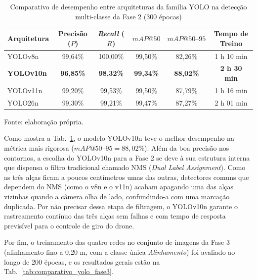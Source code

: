 \begin{table}[H]
	\centering
	\small
	\setlength{\tabcolsep}{5pt}
	\captionsetup{justification=centering}
	\caption{Comparativo de desempenho entre arquiteturas da família YOLO na detecção multi-classe da Fase 2 (300 épocas)}
	\label{tab:comparativo_yolo_fase2}
	\vspace{0.2cm}
	\begin{tabular}{lccccc}
		\hline
		\textbf{Arquitetura} & \textbf{Precisão ($P$)} & \textbf{\textit{Recall} ($R$)} & \textbf{$mAP@50$} & \textbf{$mAP@50\text{--}95$} & \textbf{Tempo de Treino} \\
		\hline
		YOLOv8n  & 99,64\% & 100,00\% & 99,50\% & 82,26\% & 1 h 10 min \\
		\textbf{YOLOv10n} & \textbf{96,85\%} & \textbf{98,32\%} & \textbf{99,34\%} & \textbf{88,02\%} & \textbf{2 h 30 min} \\
		YOLOv11n & 99,20\% & 99,53\%  & 99,50\% & 87,79\% & 1 h 16 min \\
		YOLO26n  & 99,30\% & 99,21\%  & 99,47\% & 87,27\% & 2 h 01 min \\
		\hline
	\end{tabular}
	\vspace{0.2cm}
	\begin{flushleft}
		\footnotesize Fonte: elaboração própria.
	\end{flushleft}
\end{table}

Como mostra a Tab.~\ref{tab:comparativo_yolo_fase2}, o modelo YOLOv10n teve o melhor desempenho na métrica mais rigorosa ($mAP@50\text{--}95 = 88{,}02\%$). Além da boa precisão nos contornos, a escolha do YOLOv10n para a Fase 2 se deve à sua estrutura interna que dispensa o filtro tradicional chamado NMS (\textit{Dual Label Assignment}). Como as três alças ficam a poucos centímetros umas das outras, detectores comuns que dependem do NMS (como o v8n e o v11n) acabam apagando uma das alças vizinhas quando a câmera olha de lado, confundindo-a com uma marcação duplicada. Por não precisar dessa etapa de filtragem, o YOLOv10n garante o rastreamento contínuo das três alças sem falhas e com tempo de resposta previsível para o controle de giro do drone.

Por fim, o treinamento das quatro redes no conjunto de imagens da Fase 3 (alinhamento fino a 0,20 m, com a classe única \textit{Alinhamento}) foi avaliado ao longo de 200 épocas, e os resultados gerais estão na Tab.~\ref{tab:comparativo_yolo_fase3}.

